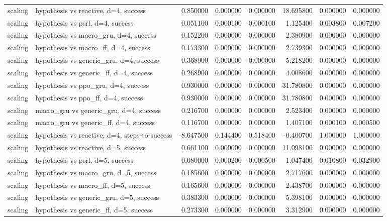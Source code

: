 \begin{tabular}{llrrrrrr}
scaling & hypothesis vs reactive, d=4, success & 0.850000 & 0.000000 & 0.000000 & 18.695800 & 0.000000 & 0.000000 \\
scaling & hypothesis vs psrl, d=4, success & 0.051100 & 0.000100 & 0.000100 & 1.125400 & 0.003800 & 0.007200 \\
scaling & hypothesis vs macro\_gru, d=4, success & 0.152200 & 0.000000 & 0.000000 & 2.380900 & 0.000000 & 0.000000 \\
scaling & hypothesis vs macro\_ff, d=4, success & 0.173300 & 0.000000 & 0.000000 & 2.739300 & 0.000000 & 0.000000 \\
scaling & hypothesis vs generic\_gru, d=4, success & 0.368900 & 0.000000 & 0.000000 & 5.218200 & 0.000000 & 0.000000 \\
scaling & hypothesis vs generic\_ff, d=4, success & 0.268900 & 0.000000 & 0.000000 & 4.008600 & 0.000000 & 0.000000 \\
scaling & hypothesis vs ppo\_gru, d=4, success & 0.930000 & 0.000000 & 0.000000 & 31.780800 & 0.000000 & 0.000000 \\
scaling & hypothesis vs ppo\_ff, d=4, success & 0.930000 & 0.000000 & 0.000000 & 31.780800 & 0.000000 & 0.000000 \\
scaling & macro\_gru vs generic\_gru, d=4, success & 0.216700 & 0.000000 & 0.000000 & 2.523400 & 0.000000 & 0.000000 \\
scaling & macro\_gru vs generic\_ff, d=4, success & 0.116700 & 0.000000 & 0.000000 & 1.407100 & 0.000100 & 0.000500 \\
scaling & hypothesis vs reactive, d=4, steps-to-success & -8.647500 & 0.144400 & 0.518400 & -0.400700 & 1.000000 & 1.000000 \\
scaling & hypothesis vs reactive, d=5, success & 0.661100 & 0.000000 & 0.000000 & 11.098100 & 0.000000 & 0.000000 \\
scaling & hypothesis vs psrl, d=5, success & 0.080000 & 0.000200 & 0.000500 & 1.047400 & 0.010800 & 0.032900 \\
scaling & hypothesis vs macro\_gru, d=5, success & 0.185600 & 0.000000 & 0.000000 & 2.717600 & 0.000000 & 0.000000 \\
scaling & hypothesis vs macro\_ff, d=5, success & 0.165600 & 0.000000 & 0.000000 & 2.438700 & 0.000000 & 0.000000 \\
scaling & hypothesis vs generic\_gru, d=5, success & 0.383300 & 0.000000 & 0.000000 & 5.398100 & 0.000000 & 0.000000 \\
scaling & hypothesis vs generic\_ff, d=5, success & 0.273300 & 0.000000 & 0.000000 & 3.312900 & 0.000000 & 0.000000 \\

\end{tabular}
